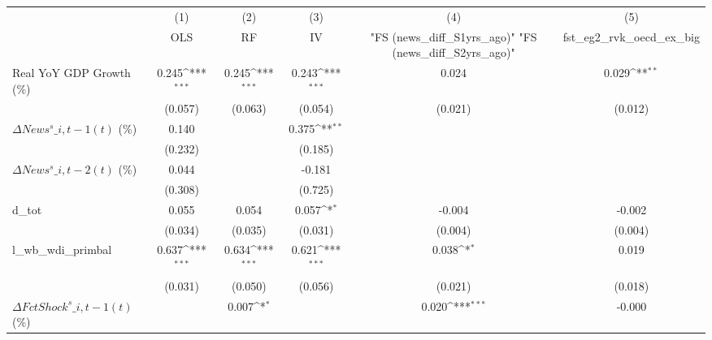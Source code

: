 {
\def\sym#1{\ifmmode^{#1}\else\(^{#1}\)\fi}
\begin{tabular}{l*{5}{c}}
\toprule
                    &\multicolumn{1}{c}{(1)}&\multicolumn{1}{c}{(2)}&\multicolumn{1}{c}{(3)}&\multicolumn{1}{c}{(4)}&\multicolumn{1}{c}{(5)}\\
                    &\multicolumn{1}{c}{OLS}&\multicolumn{1}{c}{RF}&\multicolumn{1}{c}{IV}&\multicolumn{1}{c}{ "FS (news\_diff\_S1yrs\_ago)"  "FS (news\_diff\_S2yrs\_ago)" }&\multicolumn{1}{c}{fst\_eg2\_rvk\_oecd\_ex\_big}\\
\midrule
Real YoY GDP Growth (\%)&       0.245\sym{***}&       0.245\sym{***}&       0.243\sym{***}&       0.024         &       0.029\sym{**} \\
                    &     (0.057)         &     (0.063)         &     (0.054)         &     (0.021)         &     (0.012)         \\
\addlinespace
$ \Delta News^s\_{i,t-1}(t)$ (\%)&       0.140         &                     &       0.375\sym{**} &                     &                     \\
                    &     (0.232)         &                     &     (0.185)         &                     &                     \\
\addlinespace
$ \Delta News^s\_{i,t-2}(t)$ (\%)&       0.044         &                     &      -0.181         &                     &                     \\
                    &     (0.308)         &                     &     (0.725)         &                     &                     \\
\addlinespace
d\_tot               &       0.055         &       0.054         &       0.057\sym{*}  &      -0.004         &      -0.002         \\
                    &     (0.034)         &     (0.035)         &     (0.031)         &     (0.004)         &     (0.004)         \\
\addlinespace
l\_wb\_wdi\_primbal    &       0.637\sym{***}&       0.634\sym{***}&       0.621\sym{***}&       0.038\sym{*}  &       0.019         \\
                    &     (0.031)         &     (0.050)         &     (0.056)         &     (0.021)         &     (0.018)         \\
\addlinespace
$ \Delta FctShock^s\_{i,t-1}(t)$ (\%)&                     &       0.007\sym{*}  &                     &       0.020\sym{***}&      -0.000         \\

\end{tabular}}
